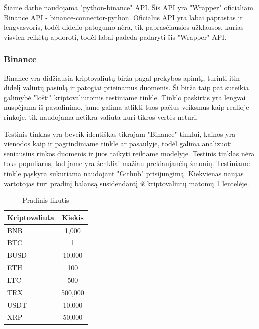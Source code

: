 \documentclass{VUMIFInfKursinis}
\begin{document}
Šiame darbe naudojama "python-binance" API. Šis API yra "Wrapper" oficialiam Binance API - binance-connector-python. 
Oficialus API yra labai paprastas ir lengvasvoris, todėl didelio patogumo nėra, tik paprasčiausios užklausos,
kurias visvien reikėtų apdoroti, todėl labai padeda padaryti šis "Wrapper" API.

\subsubsection{Binance}
Binance yra didžiausia kriptovaliutų birža pagal prekybos apimtį, turinti itin didelį valiutų pasiulą ir patogiai prieinamus duomenis. Ši birža taip pat
suteikia galimybė "lošti" kriptovaliutomis testiniame tinkle. Tinklo paskirtis yra lengvai nuspėjama iš pavadinimo, jame galima atlikti tuos pačius 
veiksmus kaip realioje rinkoje, tik naudojama netikra valiuta kuri tikros vertės neturi.

Testinis tinklas yra beveik identiškas tikrajam "Binance" tinklui, kainos yra vienodos kaip ir pagrindiniame tinkle ar pasaulyje, todėl galima analizuoti 
seniausius rinkos duomenis ir juos taikyti reikiame modelyje. Testinis tinklas nėra toks populiarus, tad jame yra ženkliai mažiau prekiaujančių žmonių. 
Testiniame tinkle pąskyra sukuriama naudojant "Github" prisijungimą. Kiekvienas naujas vartotojas turi pradinį balansą susidendantį iš kriptovaliutų
matomų 1 lentelėje.

\begin{table}[H]\footnotesize
  \centering
  \caption{Pradinis likutis}
  {\begin{tabular}{|l|c|} \hline
      Kriptovaliuta & Kiekis  \\
      \hline
      BNB           & 1,000   \\
      BTC           & 1       \\
      BUSD          & 10,000  \\
      ETH           & 100     \\
      LTC           & 500     \\
      TRX           & 500,000 \\
      USDT          & 10,000  \\
      XRP           & 50,000  \\
      \hline 
    \end{tabular}}
\end{table}
\end{document}
